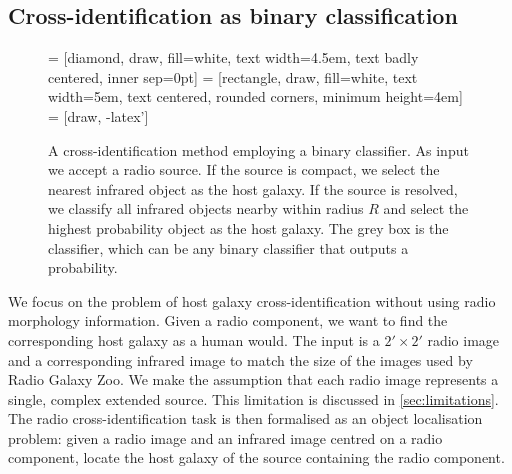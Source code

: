 \documentclass[fleqn,usenatbib,usedcolumn]{mnras}
\begin{document}
  \subsection{Cross-identification as binary
  classification}\label{cross-identification-as-binary-classification}
    \begin{figure}
      \centering
       = [diamond, draw, fill=white,
          text width=4.5em, text badly centered, inner sep=0pt]
       = [rectangle, draw, fill=white,
          text width=5em, text centered, rounded corners, minimum height=4em]
       = [draw, -latex']
      \caption{A cross-identification method employing a binary classifier. As
        input we accept a radio source. If the source is compact, we select
        the nearest infrared object as the host galaxy. If the source is
        resolved, we classify all infrared objects nearby within radius $R$
        and select the highest probability object as the host galaxy. The grey
        box is the classifier, which can be any binary classifier that outputs
        a probability.}
      \label{fig:flowchart}
    \end{figure}

    We focus on the problem of host galaxy cross-identification without using
    radio morphology information. Given a radio component, we want to find the
    corresponding host galaxy as a human would. The input is a $2' \times 2'$
    radio image and a corresponding infrared image to match the size of the
    images used by Radio Galaxy Zoo. We make the assumption that each radio
    image represents a single, complex extended source. This limitation is
    discussed in \autoref{sec:limitations}. The radio cross-identification
    task is then formalised as an object localisation problem: given a radio
    image and an infrared image centred on a radio component, locate the host
    galaxy of the source containing the radio component.
\end{document}
